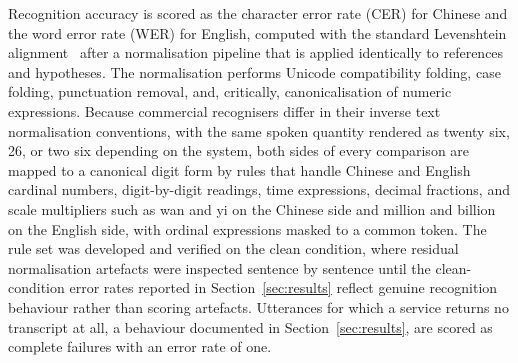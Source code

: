 Recognition accuracy is scored as the character error rate (CER) for Chinese
and the word error rate (WER) for English, computed with the standard
Levenshtein alignment~\citep{levenshtein1966binary} after a normalisation
pipeline that is applied identically to references and hypotheses. The
normalisation performs Unicode compatibility folding, case folding,
punctuation removal, and, critically, canonicalisation of numeric
expressions. Because commercial recognisers differ in their inverse text
normalisation conventions, with the same spoken quantity rendered as twenty
six, 26, or two six depending on the system, both sides of every comparison
are mapped to a canonical digit form by rules that handle Chinese and
English cardinal numbers, digit-by-digit readings, time expressions, decimal
fractions, and scale multipliers such as wan and yi on the Chinese side and
million and billion on the English side, with ordinal expressions masked to
a common token. The rule set was developed and verified on the clean
condition, where residual normalisation artefacts were inspected sentence by
sentence until the clean-condition error rates reported in
Section~\ref{sec:results} reflect genuine recognition behaviour rather than
scoring artefacts. Utterances for which a service returns no transcript at
all, a behaviour documented in Section~\ref{sec:results}, are scored as
complete failures with an error rate of one.

